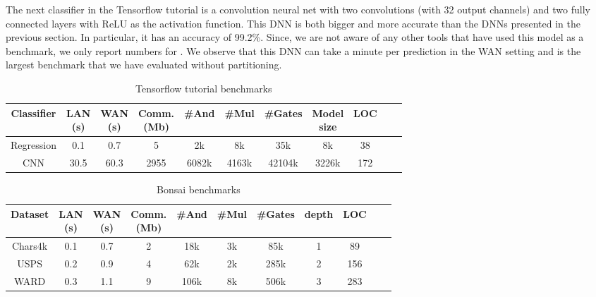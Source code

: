 The next classifier in the Tensorflow tutorial is a convolution neural net with two convolutions
(with 32 output channels) and two fully connected layers with ReLU as the activation function.
This DNN is both bigger and more accurate than the DNNs presented in the previous section.
In particular, it has an accuracy of 99.2\%.
Since, we are not aware of any other tools that have used this
model as a benchmark, we only report numbers for \tool.
We observe that this DNN can take a minute per prediction in the WAN
setting and is the largest benchmark that we have evaluated without
partitioning.


\setlength\tabcolsep{2.5pt}
\begin{table}
\begin{tabular}{|c|c|c|c |c|c|c|c|c|c | c}
\hline
Classifier       & \thead{LAN  \\ (s)} & \thead{WAN \\(s)} & \thead{Comm. \\(Mb)}  & \#And & \#Mul & \#Gates & \thead{Model \\size} & LOC\\
\hline
Regression &  0.1         & 0.7         & 5            & 2k    & 8k    &  35k    & 8k   & 38\\
\hline
CNN        &  30.5        & 60.3        & 2955         & 6082k & 4163k &  42104k & 3226k& 172\\
\hline
\end{tabular}

 \caption{Tensorflow tutorial benchmarks}
 \label{tab:tf} 
\end{table}
\setlength\tabcolsep{3.5pt}
\begin{table}
\begin{tabular}{|c|c|c|c |c|c|c|c|c|c | c|}
\hline
Dataset       & \thead{LAN \\(s)} & \thead{WAN \\(s)} & \thead{Comm. \\ (Mb)}  & \#And & \#Mul & \#Gates & depth & LOC\\
\hline
Chars4k    &  0.1         & 0.7         & 2            & 18k    & 3k    &  85k     & 1   & 89\\
\hline
USPS       &  0.2         & 0.9         & 4            & 62k    & 2k    &  285k    & 2   & 156\\
\hline
WARD       &  0.3         & 1.1         & 9            & 106k    & 8k    &  506k    & 3   & 283\\
\hline
\end{tabular}

 \caption{Bonsai benchmarks}
 \label{tab:bonsai} 
\end{table}

